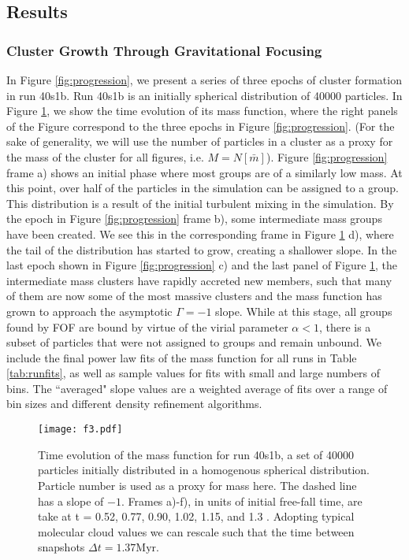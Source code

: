 \documentclass[iop]{emulateapj}
\begin{document}
\subsection{Results}
\subsubsection{Cluster Growth Through Gravitational Focusing}
In Figure \ref{fig:progression},  we present a series of three epochs of cluster formation in run 40s1b.
Run 40s1b is an initially spherical distribution of 40000 particles. In Figure \ref{fig:teval40ksphere1}, we show the time evolution of its mass function, where the right panels of the Figure correspond to the three epochs in Figure \ref{fig:progression}. (For the sake of generality, we will use the number of particles in a cluster as a proxy for the mass of the cluster for all figures, i.e. $M = N [\bar{m}]$). Figure \ref{fig:progression} frame a) shows an initial phase where most groups are of a similarly low mass. At this point, over half of the particles in the simulation can be assigned to a group. This distribution is a result of the initial turbulent mixing in the simulation. By the epoch in Figure \ref{fig:progression} frame b), some intermediate mass groups have been created. We see this in the corresponding frame in Figure \ref{fig:teval40ksphere1} d), where the tail of the distribution has started to grow, creating a shallower slope. In the last epoch shown in Figure \ref{fig:progression} c) and the last panel of Figure \ref{fig:teval40ksphere1}, the intermediate mass clusters have rapidly accreted new members, such that many of them are now some of the most massive clusters and the mass function has grown to approach the asymptotic $\Gamma = -1$ slope. While at this stage, all groups found by FOF are bound by virtue of the virial parameter $\alpha < 1$, there is a subset of particles that were not assigned to groups and remain unbound.  We include the final power law fits of the mass function for all runs in Table \ref{tab:runfits}, as well as sample values for fits with small and large numbers of bins. The ``averaged" slope values are a weighted average of fits over a range of bin sizes and different density refinement algorithms. 



\begin{figure}[h!]
    \centering
    \texttt{[image: f3.pdf]}
    \caption{Time evolution of the mass function for run 40s1b, a set of 40000 particles initially distributed in a homogenous spherical distribution. Particle number is used as a proxy for mass here. The dashed line has a slope of $-1$.  Frames a)-f), in units of initial free-fall time, are take at t = 0.52, 0.77, 0.90, 1.02, 1.15, and 1.3 . Adopting typical molecular cloud values we can rescale such that the time between snapshots $\Delta t = 1.37 \mathrm{Myr}$.}
    \label{fig:teval40ksphere1}
\end{figure}
\end{document}
